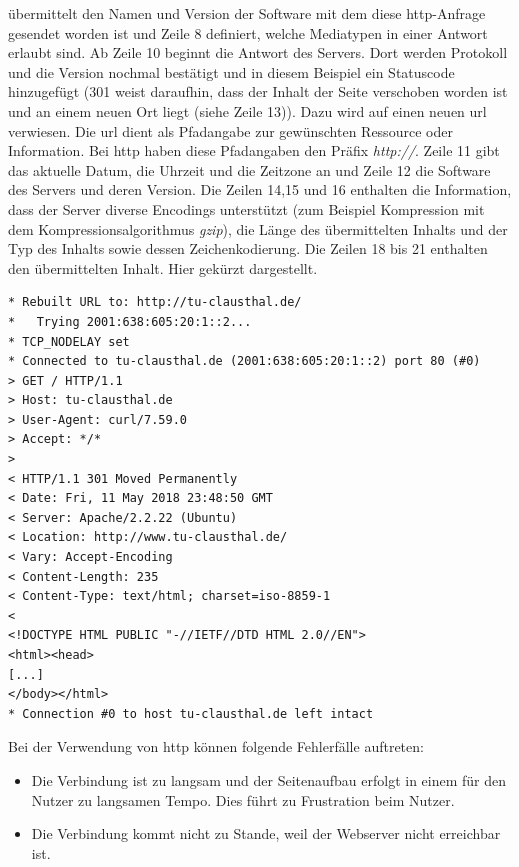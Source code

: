\documentclass[titlepage]{report}
\begin{document}
übermittelt den Namen und Version der Software mit dem diese
\gls{http}\hyp{}Anfrage gesendet worden ist und Zeile 8 definiert,
welche Mediatypen in einer Antwort erlaubt sind\cite{RFC2616}. Ab Zeile
10 beginnt die Antwort des Servers. Dort werden Protokoll und die
Version nochmal bestätigt und in diesem Beispiel ein Statuscode
hinzugefügt (301 weist daraufhin, dass der Inhalt der Seite verschoben
worden ist und an einem neuen Ort liegt (siehe Zeile 13)). Dazu wird auf
einen neuen \gls{url} verwiesen. Die \gls{url} dient als Pfadangabe zur
gewünschten Ressource oder Information. Bei \gls{http} haben diese
Pfadangaben den Präfix \emph{http://}. Zeile 11 gibt
das aktuelle Datum, die Uhrzeit und die Zeitzone an und Zeile 12 die
Software des Servers und deren Version. Die Zeilen 14,15 und 16
enthalten die Information, dass der Server diverse Encodings unterstützt
(zum Beispiel Kompression mit dem Kompressionsalgorithmus \emph{gzip}),
die Länge des übermittelten Inhalts und der Typ des Inhalts sowie dessen
Zeichenkodierung. Die Zeilen 18 bis 21 enthalten den übermittelten
Inhalt. Hier gekürzt dargestellt.
\begin{minipage}{\linewidth}
\begin{lstlisting}[caption={Eine HTTP-Anfrage an
http://tu-clausthal.de},label={lst:1}]
* Rebuilt URL to: http://tu-clausthal.de/
*   Trying 2001:638:605:20:1::2...
* TCP_NODELAY set
* Connected to tu-clausthal.de (2001:638:605:20:1::2) port 80 (#0)
> GET / HTTP/1.1
> Host: tu-clausthal.de
> User-Agent: curl/7.59.0
> Accept: */*
>
< HTTP/1.1 301 Moved Permanently
< Date: Fri, 11 May 2018 23:48:50 GMT
< Server: Apache/2.2.22 (Ubuntu)
< Location: http://www.tu-clausthal.de/
< Vary: Accept-Encoding
< Content-Length: 235
< Content-Type: text/html; charset=iso-8859-1
<
<!DOCTYPE HTML PUBLIC "-//IETF//DTD HTML 2.0//EN">
<html><head>
[...]
</body></html>
* Connection #0 to host tu-clausthal.de left intact
\end{lstlisting}
\end{minipage}
Bei der Verwendung von \gls{http} können folgende Fehlerfälle auftreten:
\begin{itemize}
    \item Die Verbindung ist zu langsam und der Seitenaufbau erfolgt in
          einem für den Nutzer zu langsamen Tempo. Dies führt zu
          Frustration beim Nutzer.
    \item Die Verbindung kommt nicht zu Stande, weil der Webserver nicht
          erreichbar ist.
\end{itemize}
\end{document}
